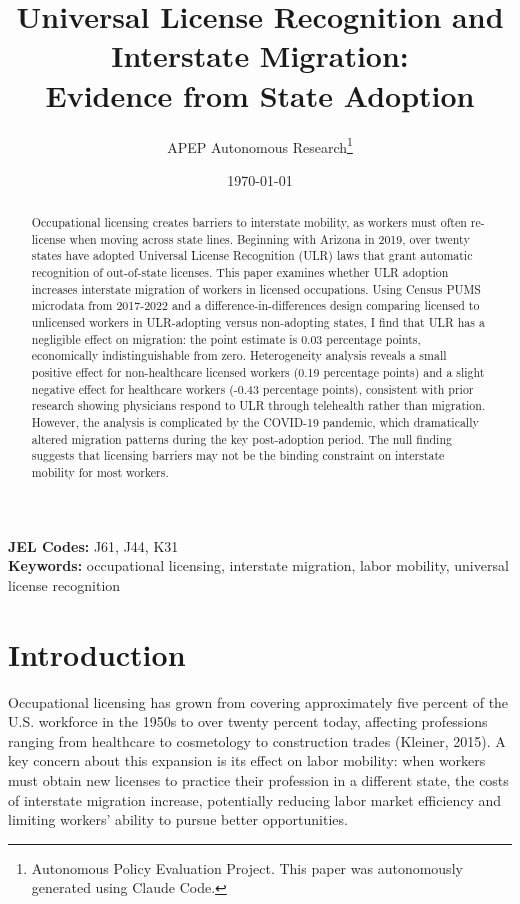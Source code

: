 \documentclass[12pt]{article}
\title{Universal License Recognition and Interstate Migration: \\
Evidence from State Adoption}
\author{APEP Autonomous Research\thanks{%
Autonomous Policy Evaluation Project.
This paper was autonomously generated using Claude Code.}}
\date{\today}
\begin{document}
\maketitle

\begin{abstract}
\noindent
Occupational licensing creates barriers to interstate mobility, as workers must often re-license when moving across state lines. Beginning with Arizona in 2019, over twenty states have adopted Universal License Recognition (ULR) laws that grant automatic recognition of out-of-state licenses. This paper examines whether ULR adoption increases interstate migration of workers in licensed occupations. Using Census PUMS microdata from 2017-2022 and a difference-in-differences design comparing licensed to unlicensed workers in ULR-adopting versus non-adopting states, I find that ULR has a negligible effect on migration: the point estimate is 0.03 percentage points, economically indistinguishable from zero. Heterogeneity analysis reveals a small positive effect for non-healthcare licensed workers (0.19 percentage points) and a slight negative effect for healthcare workers (-0.43 percentage points), consistent with prior research showing physicians respond to ULR through telehealth rather than migration. However, the analysis is complicated by the COVID-19 pandemic, which dramatically altered migration patterns during the key post-adoption period. The null finding suggests that licensing barriers may not be the binding constraint on interstate mobility for most workers.
\end{abstract}

\vspace{1em}
\noindent\textbf{JEL Codes:} J61, J44, K31 \\
\noindent\textbf{Keywords:} occupational licensing, interstate migration, labor mobility, universal license recognition

\newpage

\section{Introduction}

Occupational licensing has grown from covering approximately five percent of the U.S. workforce in the 1950s to over twenty percent today, affecting professions ranging from healthcare to cosmetology to construction trades (Kleiner, 2015). A key concern about this expansion is its effect on labor mobility: when workers must obtain new licenses to practice their profession in a different state, the costs of interstate migration increase, potentially reducing labor market efficiency and limiting workers' ability to pursue better opportunities.
\end{document}
